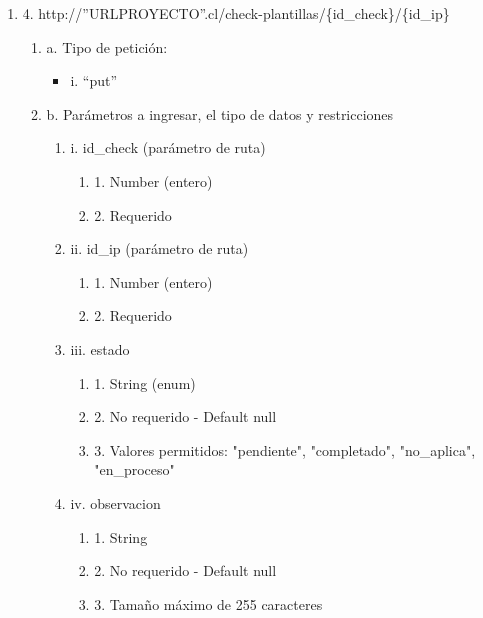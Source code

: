\begin{enumerate}
    \item 4. http://”URLPROYECTO”.cl/check-plantillas/\{id\_check\}/\{id\_ip\}
    \begin{enumerate}
        \item a. Tipo de petición:
            \begin{itemize}
               \item i. “put”
            \end{itemize}
        \item b. Parámetros a ingresar, el tipo de datos y restricciones
            \begin{enumerate}
                \item i. id\_check (parámetro de ruta)
                    \begin{enumerate}
                        \item 1. Number (entero)
                        \item 2. Requerido
                    \end{enumerate}
                \item ii. id\_ip (parámetro de ruta)
                    \begin{enumerate}
                        \item 1. Number (entero)
                        \item 2. Requerido
                    \end{enumerate}
                \item iii. estado
                    \begin{enumerate}
                        \item 1. String (enum)
                        \item 2. No requerido - Default null
                        \item 3. Valores permitidos: "pendiente", "completado", "no\_aplica", "en\_proceso"
                    \end{enumerate}
                \item iv. observacion
                    \begin{enumerate}
                        \item 1. String
                        \item 2. No requerido - Default null
                        \item 3. Tamaño máximo de 255 caracteres
                    \end{enumerate}
            \end{enumerate}
    \end{enumerate}
\end{enumerate}

